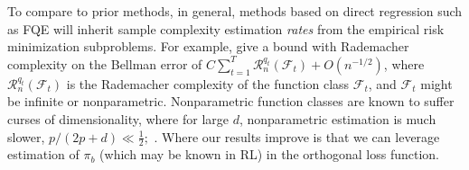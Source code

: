 \documentclass[opre,nonblindrev]{informs4}
\begin{document}
To compare to prior methods, in general, methods based on direct regression such as FQE will inherit sample complexity estimation \textit{rates} from the empirical risk minimization subproblems. For example, \citep{duan2021risk} give a bound with Rademacher complexity on the Bellman error of $C \sum_{t=1}^T \mathcal{R}_n^{q_t}\left(\mathcal{F}_t\right)+O(n^{-1/2})$, where $\mathcal{R}_n^{q_t}\left(\mathcal{F}_t\right)$ is the Rademacher complexity of the function class $\mathcal{F}_t$, and $\mathcal{F}_t$ might be infinite or nonparametric. 
Nonparametric function classes are known to suffer curses of dimensionality, where for large $d$, nonparametric estimation is much slower, $p/(2p+d) \ll \frac 12;$ \citep{stone1980optimal}. Where our results improve is that we can leverage estimation of $\pi_b$ (which may be known in RL) in the orthogonal loss function.
\end{document}
